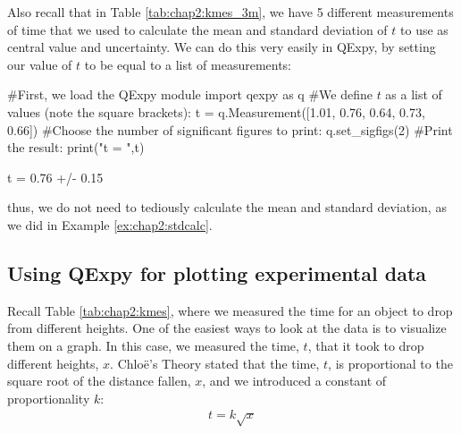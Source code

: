 Also recall that in Table \ref{tab:chap2:kmes_3m}, we have 5 different measurements of time that we used to calculate the mean and standard deviation of $t$ to use as central value and uncertainty. We can do this very easily in QExpy, by setting our value of $t$ to be equal to a list of measurements:
\begin{python}[caption=QExpy to calculate mean and standard deviation] 
#First, we load the QExpy module
import qexpy as q
#We define $t$ as a list of values (note the square brackets):
t = q.Measurement([1.01,  0.76,  0.64,  0.73,  0.66])
#Choose the number of significant figures to print:
q.set_sigfigs(2)
#Print the result:
print("t = ",t)
\end{python}
\begin{poutput}
t = 0.76 +/- 0.15
\end{poutput}
thus, we do not need to tediously calculate the mean and standard deviation, as we did in Example \ref{ex:chap2:stdcalc}.


\subsection{Using QExpy for plotting experimental data}
Recall Table \ref{tab:chap2:kmes}, where we measured the time for an object to drop from different heights. One of the easiest ways to look at the data is to visualize them on a graph. In this case, we measured the time, $t$, that it took to drop different heights, $x$. Chlo\"e's Theory stated that the time, $t$, is proportional to the square root of the distance fallen, $x$, and we introduced a constant of proportionality $k$:
\begin{align*}
t = k \sqrt{x}
\end{align*}

